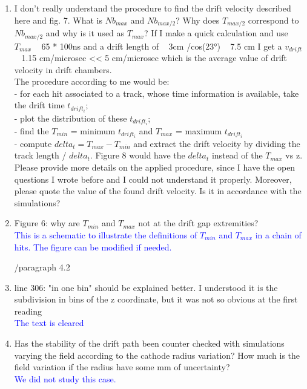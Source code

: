 \documentclass[a4paper,11pt,twoside]{article}
\begin{document}
\begin{enumerate}
\item I don't really understand the procedure to find the drift velocity 
   described here and fig. 7. What is $Nb_{max}$ and $Nb_{max/2}$? Why does 
   $T_{max/2}$ correspond to $Nb_{max/2}$ and why is it used as $T_{max}$? If I 
   make a quick calculation and use $T_{max}$ ~ 65 * 100ns and a drift length 
   of ~ 3cm /cos(23°) ~ 7.5 cm I get a $v_{drift}$ ~ 1.15 cm/microsec << 5 
   cm/microsec which is the average value of drift velocity in drift 
   chambers.\\
The procedure according to me would be:\\
- for each hit associated to a track, whose time information is available, take 
the drift time $t_{drift_{i}}$;\\
- plot the distribution of these $t_{drift_{i}}$;\\
- find the $T_{min}$ = minimum $t_{drift_{i}}$ and $T_{max}$ = maximum 
$t_{drift_{i}}$\\
- compute $delta_{t} = T_{max} - T_{min}$ and extract the drift velocity by 
dividing the track length / $delta_{t}$. Figure 8 would have the $delta_{t}$ 
instead of the $T_{max}$ vs z.\\
Please provide more details on the applied procedure, since I have the open 
questions I wrote before and I could not understand it properly. Moreover, 
please quote the value of the found drift velocity. Is it in accordance with 
the simulations?\\
\textcolor{blue}{ } 

\item Figure 6: why are $T_{min}$ and $T_{max}$ not at the drift gap 
   extremities?\\
   \textcolor{blue}{This is a schematic to illustrate the definitions of 
   $T_{min}$ and $T_{max}$ in a chain of hits. The figure can be modified if 
needed.} 

        /paragraph 4.2

\item line 306: "in one bin" should be explained better. I understood it is the 
   subdivision in bins of the z coordinate, but it was not so obvious at the 
   first reading\\
\textcolor{blue}{The text is cleared} 

\item Has the stability of the drift path been counter checked with simulations 
   varying the field according to the cathode radius variation? How much is the 
   field variation if the radius have some mm of uncertainty?\\
\textcolor{blue}{We did not study this case. } 


\end{enumerate}
\end{document}
